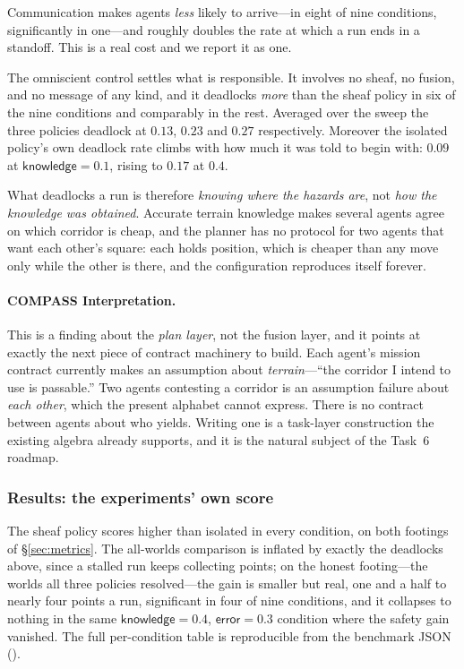\documentclass[11pt]{article}
\theoremstyle{definition}
\theoremstyle{remark}
\begin{document}
Communication makes agents \emph{less} likely to arrive---in eight of nine conditions,
significantly in one---and roughly doubles the rate at which a run ends in a standoff.
This is a real cost and we report it as one.

The omniscient control settles what is responsible.
It involves no sheaf, no fusion, and no message of any kind, and it deadlocks \emph{more} than
the sheaf policy in six of the nine conditions and comparably in the rest.
Averaged over the sweep the three policies deadlock at $0.13$, $0.23$ and $0.27$ respectively.
Moreover the isolated policy's own deadlock rate climbs with how much it was told to begin with:
$0.09$ at $\textsf{knowledge} = 0.1$, rising to $0.17$ at $0.4$.

What deadlocks a run is therefore \emph{knowing where the hazards are}, not \emph{how the
knowledge was obtained}.
Accurate terrain knowledge makes several agents agree on which corridor is cheap, and the
planner has no protocol for two agents that want each other's square: each holds position,
which is cheaper than any move only while the other is there, and the configuration reproduces
itself forever.

\paragraph{COMPASS Interpretation.}
This is a finding about the \emph{plan layer}, not the fusion layer, and it points at exactly
the next piece of contract machinery to build.
Each agent's mission contract currently makes an assumption about \emph{terrain}---``the
corridor I intend to use is passable.''
Two agents contesting a corridor is an assumption failure about \emph{each other}, which the
present alphabet cannot express.
There is no contract between agents about who yields.
Writing one is a task-layer construction the existing algebra already supports, and it is the
natural subject of the Task~6 roadmap.

\subsubsection{Results: the experiments' own score}
\label{sec:score}

The sheaf policy scores higher than \textsf{isolated} in every condition, on both footings of
\S\ref{sec:metrics}.
The all-worlds comparison is inflated by exactly the deadlocks above, since a stalled run keeps
collecting points; on the honest footing---the worlds all three policies resolved---the gain is
smaller but real, one and a half to nearly four points a run, significant in four of nine
conditions, and it collapses to nothing in the same $\textsf{knowledge} = 0.4$,
$\textsf{error} = 0.3$ condition where the safety gain vanished.
The full per-condition table is reproducible from the benchmark JSON
().
\end{document}
